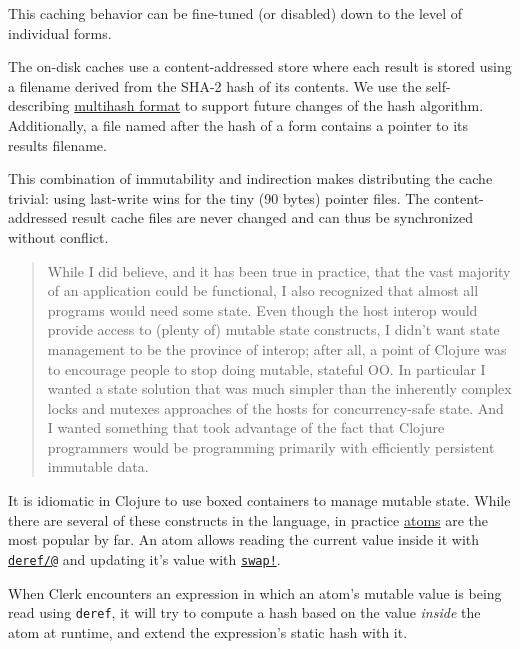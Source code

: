 \documentclass[sigconf,screen]{acmart}
\newcommand{\passthrough}[1]{#1}
\begin{document}
This caching behavior can be fine-tuned (or disabled) down to the level of individual forms.

The on-disk caches use a content-addressed store where each result is stored using a filename derived from the SHA-2 hash of its contents. We use the self-describing \href{https://multiformats.io/multihash/}{multihash format} to support future changes of the hash algorithm. Additionally, a file named after the hash of a form contains a pointer to its results filename.

This combination of immutability and indirection makes distributing the cache trivial: using last-write wins for the tiny (90 bytes) pointer files. The content-addressed result cache files are never changed and can thus be synchronized without conflict.

\begin{quote}
While I did believe, and it has been true in practice, that the vast majority of an application could be functional, I also recognized that almost all programs would need some state. Even though the host interop would provide access to (plenty of) mutable state constructs, I didn't want state management to be the province of interop; after all, a point of Clojure was to encourage people to stop doing mutable, stateful OO. In particular I wanted a state solution that was much simpler than the inherently complex locks and mutexes approaches of the hosts for concurrency-safe state. And I wanted something that took advantage of the fact that Clojure programmers would be programming primarily with efficiently persistent immutable data.
\end{quote}

It is idiomatic in Clojure to use boxed containers to manage mutable state. While there are several of these constructs in the language, in practice \href{https://clojure.org/reference/atoms}{atoms} are the most popular by far. An atom allows reading the current value inside it with \href{https://clojure.github.io/clojure/clojure.core-api.html\#clojure.core/deref}{\passthrough{\lstinline!deref/@!}} and updating it's value with \href{https://clojure.github.io/clojure/clojure.core-api.html\#clojure.core/swap!}{\passthrough{\lstinline"swap!"}}.

When Clerk encounters an expression in which an atom's mutable value is being read using \passthrough{\lstinline!deref!}, it will try to compute a hash based on the value \emph{inside} the atom  at runtime, and extend the expression's static hash with it.
\end{document}
